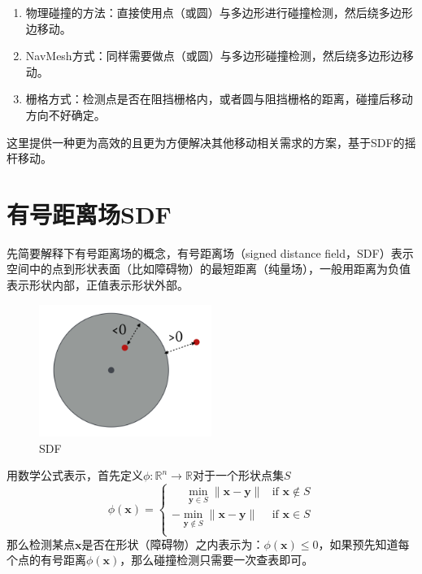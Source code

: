 \begin{enumerate}
\def\labelenumi{\arabic{enumi}.}
\tightlist
\item
  物理碰撞的方法：直接使用点（或圆）与多边形进行碰撞检测，然后绕多边形边移动。
\item
  NavMesh方式：同样需要做点（或圆）与多边形碰撞检测，然后绕多边形边移动。
\item
  栅格方式：检测点是否在阻挡栅格内，或者圆与阻挡栅格的距离，碰撞后移动方向不好确定。
\end{enumerate}

这里提供一种更为高效的且更为方便解决其他移动相关需求的方案，基于SDF的摇杆移动。

\hypertarget{ux6709ux53f7ux8dddux79bbux573asdf}{%
\section{有号距离场SDF}\label{ux6709ux53f7ux8dddux79bbux573asdf}}

先简要解释下有号距离场的概念，有号距离场（signed distance
field，SDF）表示空间中的点到形状表面（比如障碍物）的最短距离（纯量场），一般用距离为负值表示形状内部，正值表示形状外部。

\begin{figure}
\centering
\includegraphics[width=0.5\textwidth,height=\textheight]{SDF.png}
\caption{SDF}
\end{figure}

用数学公式表示，首先定义\(\phi:\mathbb{R}^n \to \mathbb{R}\)对于一个形状点集\(S\)
\[
\phi(\mathbf{x})=
\begin{cases}
\phantom{-}\min\limits_{\mathbf{y}\in S}\|\mathbf{x}-\mathbf{y}\| & \text{if }\mathbf{x}\notin S\\
-\min\limits_{\mathbf{y}\notin S}\|\mathbf{x}-\mathbf{y}\| & \text{if }\mathbf{x}\in S\\
\end{cases}
\]
那么检测某点\(\mathbf{x}\)是否在形状（障碍物）之内表示为：\(\phi(\mathbf{x}) \leqslant 0\)，如果预先知道每个点的有号距离\(\phi(\mathbf{x})\)，那么碰撞检测只需要一次查表即可。

